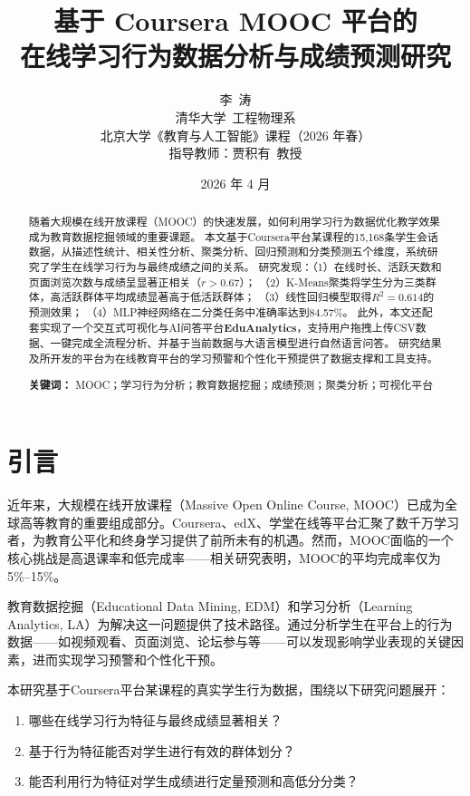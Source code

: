 \documentclass[UTF8, 12pt, a4paper]{ctexart}
\title{\textbf{基于 Coursera MOOC 平台的\\在线学习行为数据分析与成绩预测研究}}
\author{李\ 涛 \\[0.4em]
\normalsize 清华大学\ 工程物理系 \\
\normalsize 北京大学《教育与人工智能》课程（2026 年春）\\
\normalsize 指导教师：贾积有\ 教授}
\date{2026 年 4 月}
\begin{document}
\maketitle
\thispagestyle{empty}

\begin{abstract}
随着大规模在线开放课程（MOOC）的快速发展，如何利用学习行为数据优化教学效果成为教育数据挖掘领域的重要课题。
本文基于Coursera平台某课程的15,168条学生会话数据，从描述性统计、相关性分析、聚类分析、回归预测和分类预测五个维度，系统研究了学生在线学习行为与最终成绩之间的关系。
研究发现：（1）在线时长、活跃天数和页面浏览次数与成绩呈显著正相关（$r>0.67$）；
（2）K-Means聚类将学生分为三类群体，高活跃群体平均成绩显著高于低活跃群体；
（3）线性回归模型取得$R^2=0.614$的预测效果；
（4）MLP神经网络在二分类任务中准确率达到84.57\%。
此外，本文还配套实现了一个交互式可视化与AI问答平台\textbf{EduAnalytics}，支持用户拖拽上传CSV数据、一键完成全流程分析、并基于当前数据与大语言模型进行自然语言问答。
研究结果及所开发的平台为在线教育平台的学习预警和个性化干预提供了数据支撑和工具支持。

\vspace{1em}
\noindent\textbf{关键词：} MOOC；学习行为分析；教育数据挖掘；成绩预测；聚类分析；可视化平台
\end{abstract}

\newpage
\setcounter{page}{1}
\tableofcontents
\newpage

\section{引言}

近年来，大规模在线开放课程（Massive Open Online Course, MOOC）已成为全球高等教育的重要组成部分\cite{jordan2015mooc}。Coursera、edX、学堂在线等平台汇聚了数千万学习者，为教育公平化和终身学习提供了前所未有的机遇。然而，MOOC面临的一个核心挑战是高退课率和低完成率——相关研究表明，MOOC的平均完成率仅为5\%--15\%\cite{khalil2014mooc}。

教育数据挖掘（Educational Data Mining, EDM）和学习分析（Learning Analytics, LA）为解决这一问题提供了技术路径\cite{romero2020edm}。通过分析学生在平台上的行为数据——如视频观看、页面浏览、论坛参与等——可以发现影响学业表现的关键因素，进而实现学习预警和个性化干预。

本研究基于Coursera平台某课程的真实学生行为数据，围绕以下研究问题展开：
\begin{enumerate}[label=RQ\arabic*.]
    \item 哪些在线学习行为特征与最终成绩显著相关？
    \item 基于行为特征能否对学生进行有效的群体划分？
    \item 能否利用行为特征对学生成绩进行定量预测和高低分分类？
\end{enumerate}
\end{document}
